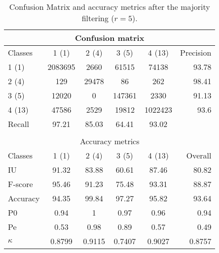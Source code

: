 \begin{table}[H]
\begin{center}
\footnotesize
\begin{tabular}{|l|c|c|c|c|r|}
\hline
\multicolumn{6}{|c|}{Confusion matrix} \\
\hline
 Classes & 1 (1) & 2 (4) & 3 (5) & 4 (13) & Precision \\
\hline
1 (1) & 2083695 & 2660 & 61515 & 74138 & 93.78 \\
\hline
2 (4) & 129 & 29478 & 86 & 262 & 98.41 \\
\hline
3 (5) & 12020 & 0 & 147361 & 2330 & 91.13 \\
\hline
4 (13) & 47586 & 2529 & 19812 & 1022423 & 93.6 \\
\hline
Recall & 97.21 & 85.03 & 64.41 & 93.02 &  \\
\hline
\multicolumn{6}{c}{ } \\
\hline
\multicolumn{6}{|c|}{Accuracy metrics} \\
\hline
 Classes & 1 (1) & 2 (4) & 3 (5) & 4 (13) & Overall \\
\hline
IU & 91.32 & 83.88 & 60.61 & 87.46 & 80.82 \\
\hline
F-score & 95.46 & 91.23 & 75.48 & 93.31 & 88.87 \\
\hline
Accuracy & 94.35 & 99.84 & 97.27 & 95.82 & 93.64 \\
\hline
P0 & 0.94 & 1 & 0.97 & 0.96 & 0.94 \\
\hline
Pe & 0.53 & 0.98 & 0.89 & 0.57 & 0.49 \\
\hline
$\kappa$ & 0.8799 & 0.9115 & 0.7407 & 0.9027 & 0.8757 \\
\hline
\end{tabular}
\caption{Confusion Matrix and accuracy metrics after the majority filtering ($r=5$).}
\label{table:}
\end{center}
\end{table}
